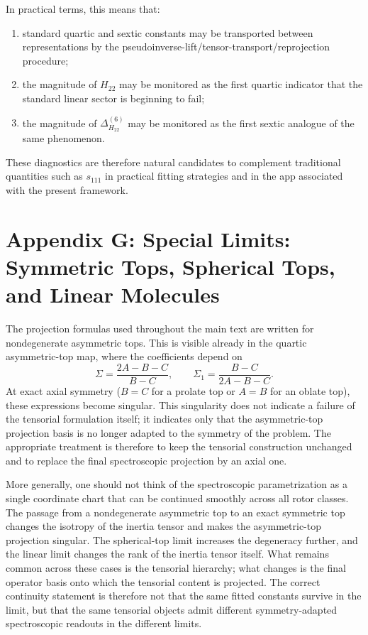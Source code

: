 \documentclass[aip,jcp,reprint,floatfix]{revtex4-2}
\begin{document}
In practical terms, this means that:
\begin{enumerate}
\item standard quartic and sextic constants may be transported between
representations by the pseudoinverse-lift/tensor-transport/reprojection
procedure;
\item the magnitude of $H_{22}$ may be monitored as the first quartic indicator
that the standard linear sector is beginning to fail;
\item the magnitude of $\Delta^{(6)}_{H_{22}}$ may be monitored as the first
sextic analogue of the same phenomenon.
\end{enumerate}
These diagnostics are therefore natural candidates to complement traditional
quantities such as $s_{111}$ in practical fitting strategies and in the app
associated with the present framework.

\section{Appendix G: Special Limits: Symmetric Tops, Spherical Tops, and Linear Molecules}
\label{sec:appendix_special_limits}

The projection formulas used throughout the main text are written for
nondegenerate asymmetric tops. This is visible already in the quartic
asymmetric-top map, where the coefficients depend on
\begin{equation}
\Sigma = \frac{2A-B-C}{B-C},
\qquad
\Sigma_1 = \frac{B-C}{2A-B-C}.
\end{equation}
At exact axial symmetry ($B=C$ for a prolate top or $A=B$ for an oblate top),
these expressions become singular. This singularity does not indicate a failure
of the tensorial formulation itself; it indicates only that the asymmetric-top
projection basis is no longer adapted to the symmetry of the problem. The
appropriate treatment is therefore to keep the tensorial construction unchanged
and to replace the final spectroscopic projection by an axial one.

More generally, one should not think of the spectroscopic parametrization as a
single coordinate chart that can be continued smoothly across all rotor
classes. The passage from a nondegenerate asymmetric top to an exact symmetric
top changes the isotropy of the inertia tensor and makes the asymmetric-top
projection singular. The spherical-top limit increases the degeneracy further,
and the linear limit changes the rank of the inertia tensor itself. What
remains common across these cases is the tensorial hierarchy; what changes is
the final operator basis onto which the tensorial content is projected. The
correct continuity statement is therefore not that the same fitted constants
survive in the limit, but that the same tensorial objects admit different
symmetry-adapted spectroscopic readouts in the different limits.
\end{document}
